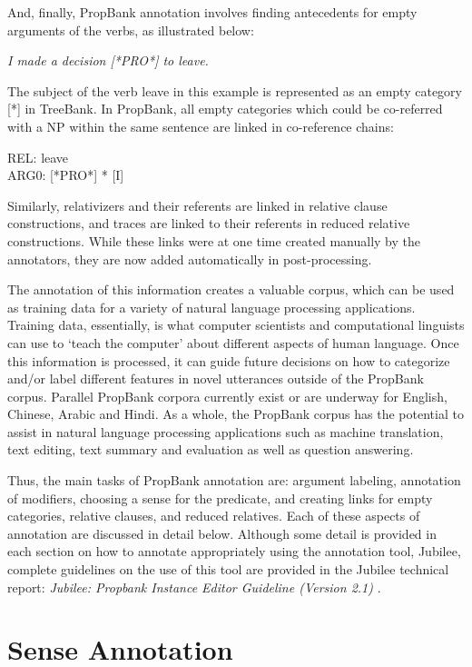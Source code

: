\documentclass[11pt]{report}
\begin{document}
\noindent And, finally, PropBank annotation involves finding antecedents for empty arguments of the verbs, as illustrated below:

\textit{I made a decision [*PRO*] to leave.}

\noindent The subject of the verb leave in this example is represented as an empty category [*] in TreeBank. In PropBank, all empty categories which could be co-referred with a NP within the same sentence are linked in co-reference chains:

REL: 	leave\\
ARG0: 	[*PRO*]  * [I]

Similarly, relativizers and their referents are linked in relative clause constructions, and traces are linked to their referents in reduced relative constructions.  While these links were at one time created manually by the annotators, they are now added automatically in post-processing.  

The annotation of this information creates a valuable corpus, which can be used as training data for a variety of natural language processing applications.  Training data, essentially, is what computer scientists and computational linguists can use to `teach the computer' about different aspects of human language.  Once this information is processed, it can guide future decisions on how to categorize and/or label different features in novel utterances outside of the PropBank corpus.  Parallel PropBank corpora currently exist or are underway for English, Chinese, Arabic and Hindi.   As a whole, the PropBank corpus has the potential to assist in natural language processing applications such as machine translation, text editing, text summary and evaluation as well as question answering.  
 
 Thus, the main tasks of PropBank annotation are: argument labeling, annotation of modifiers, choosing a sense for the predicate, and creating links for empty categories, relative clauses, and reduced relatives.  Each of these aspects of annotation are discussed in detail below.  Although some detail is provided in each section on how to annotate appropriately using the annotation tool, Jubilee, complete guidelines on the use of this tool are provided in  the Jubilee technical report: \textit{Jubilee: Propbank Instance Editor Guideline (Version 2.1)} \cite{choi-09b}.
 
\section{Sense Annotation}
\end{document}
